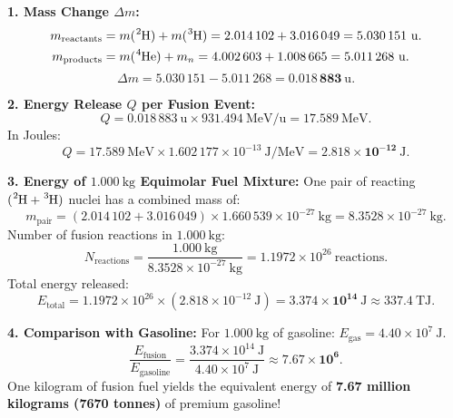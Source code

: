 \begin{solution}
\textbf{1. Mass Change $\Delta m$:}
\begin{align*}
m_{\text{reactants}} &= m(\ce{^{2}H}) + m(\ce{^{3}H}) = 2.014\,102 + 3.016\,049 = 5.030\,151\ \mathrm{u}. \\
m_{\text{products}} &= m(\ce{^{4}He}) + m_n = 4.002\,603 + 1.008\,665 = 5.011\,268\ \mathrm{u}.
\end{align*}
\[
\Delta m = 5.030\,151 - 5.011\,268 = \mathbf{0.018\,883\ \mathrm{u}}.
\]

\textbf{2. Energy Release $Q$ per Fusion Event:}
\[
Q = 0.018\,883\ \mathrm{u} \times 931.494\ \mathrm{MeV/u} = \mathbf{17.589\ \mathrm{MeV}}.
\]
In Joules:
\[
Q = 17.589\ \mathrm{MeV} \times 1.602\,177 \times 10^{-13}\ \mathrm{J/MeV} = \mathbf{2.818 \times 10^{-12}\ \mathrm{J}}.
\]

\textbf{3. Energy of $1.000\ \mathrm{kg}$ Equimolar Fuel Mixture:}
One pair of reacting $(\ce{^2H} + \ce{^3H})$ nuclei has a combined mass of:
\[
m_{\text{pair}} = (2.014\,102 + 3.016\,049) \times 1.660\,539 \times 10^{-27}\ \mathrm{kg} = 8.3528 \times 10^{-27}\ \mathrm{kg}.
\]
Number of fusion reactions in $1.000\ \mathrm{kg}$:
\[
N_{\text{reactions}} = \frac{1.000\ \mathrm{kg}}{8.3528 \times 10^{-27}\ \mathrm{kg}} = 1.1972 \times 10^{26}\ \text{reactions}.
\]
Total energy released:
\[
E_{\text{total}} = 1.1972 \times 10^{26} \times (2.818 \times 10^{-12}\ \mathrm{J}) = \mathbf{3.374 \times 10^{14}\ \mathrm{J}} \approx \mathbf{337.4\ \mathrm{TJ}}.
\]

\textbf{4. Comparison with Gasoline:}
For $1.000\ \mathrm{kg}$ of gasoline: $E_{\text{gas}} = 4.40 \times 10^7\ \mathrm{J}$.
\[
\frac{E_{\text{fusion}}}{E_{\text{gasoline}}} = \frac{3.374 \times 10^{14}\ \mathrm{J}}{4.40 \times 10^7\ \mathrm{J}} \approx \mathbf{7.67 \times 10^6}.
\]
One kilogram of fusion fuel yields the equivalent energy of \textbf{7.67 million kilograms (7670 tonnes)} of premium gasoline!
\end{solution}

